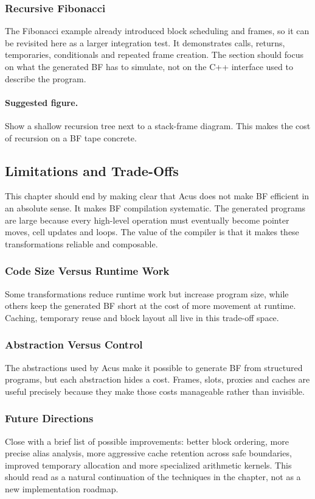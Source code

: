 \subsubsection{Recursive Fibonacci}
The Fibonacci example already introduced block scheduling and frames, so it can be revisited here as a larger integration test. It demonstrates calls, returns, temporaries, conditionals and repeated frame creation. The section should focus on what the generated BF has to simulate, not on the C++ interface used to describe the program.

\paragraph{Suggested figure.}
Show a shallow recursion tree next to a stack-frame diagram. This makes the cost of recursion on a BF tape concrete.

\subsection{Limitations and Trade-Offs}
This chapter should end by making clear that Acus does not make BF efficient in an absolute sense. It makes BF compilation systematic. The generated programs are large because every high-level operation must eventually become pointer moves, cell updates and loops. The value of the compiler is that it makes these transformations reliable and composable.

\subsubsection{Code Size Versus Runtime Work}
Some transformations reduce runtime work but increase program size, while others keep the generated BF short at the cost of more movement at runtime. Caching, temporary reuse and block layout all live in this trade-off space.

\subsubsection{Abstraction Versus Control}
The abstractions used by Acus make it possible to generate BF from structured programs, but each abstraction hides a cost. Frames, slots, proxies and caches are useful precisely because they make those costs manageable rather than invisible.

\subsubsection{Future Directions}
Close with a brief list of possible improvements: better block ordering, more precise alias analysis, more aggressive cache retention across safe boundaries, improved temporary allocation and more specialized arithmetic kernels. This should read as a natural continuation of the techniques in the chapter, not as a new implementation roadmap.
